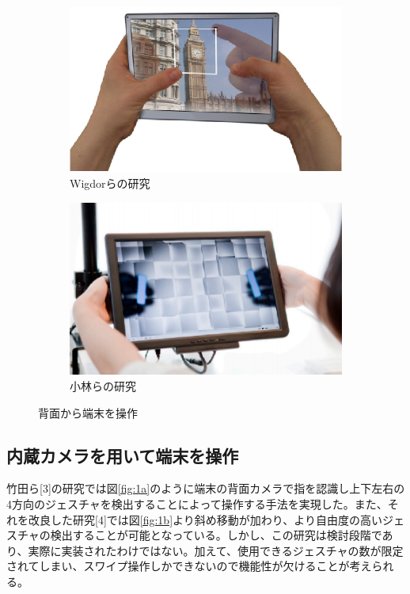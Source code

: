 \documentclass[11pt,a4j, titlepage]{jarticle} %
\begin{document}
\begin{figure}[H]
	\centering
	\begin{subfigure}{0.4\columnwidth}
		\centering
		\includegraphics[width=\columnwidth]{lucid.eps}
		\caption{Wigdorらの研究}
		\label{wigdor}
	\end{subfigure}
	\begin{subfigure}{0.4\columnwidth}
		\centering
		\includegraphics[width=\columnwidth]{uratouch.eps}
		\caption{小林らの研究}
		\label{kobayashi}
	\end{subfigure}
	\caption{背面から端末を操作}
	\label{fig:f1}
\end{figure}


\subsection{内蔵カメラを用いて端末を操作}
竹田ら[3]の研究では図\ref{fig:1a}のように端末の背面カメラで指を認識し上下左右の4方向のジェスチャを検出することによって操作する手法を実現した。また、それを改良した研究[4]では図\ref{fig:1b}より斜め移動が加わり、より自由度の高いジェスチャの検出することが可能となっている。しかし、この研究は検討段階であり、実際に実装されたわけではない。加えて、使用できるジェスチャの数が限定されてしまい、スワイプ操作しかできないので機能性が欠けることが考えられる。
\end{document}
